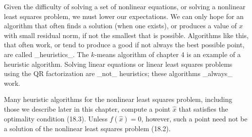 Given the difficulty of solving a set of nonlinear equations, or solving a nonlinear least squares problem, we must lower our expectations. We can only hope for an algorithm that often finds a solution (when one exists), or produces a value of \(x\) with small residual norm, if not the smallest that is possible. Algorithms like this, that often work, or tend to produce a good if not always the best possible point, are called _heuristics_. The \(k\)-means algorithm of chapter 4 is an example of a heuristic algorithm. Solving linear equations or linear least squares problems using the QR factorization are _not_ heuristics; these algorithms _always_ work.

Many heuristic algorithms for the nonlinear least squares problem, including those we describe later in this chapter, compute a point \(\hat{x}\) that satisfies the optimality condition (18.3). Unless \(f(\hat{x})=0\), however, such a point need not be a solution of the nonlinear least squares problem (18.2).

 